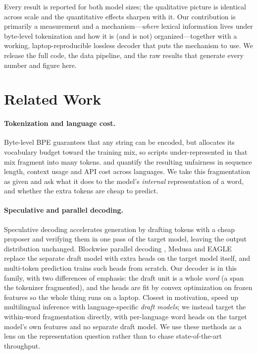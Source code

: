 \documentclass[11pt]{article}
\begin{document}
Every result is reported for both model sizes; the qualitative picture is
identical across scale and the quantitative effects sharpen with it. Our
contribution is primarily a measurement and a mechanism---\emph{where} lexical
information lives under byte-level tokenization and how it is (and is not)
organized---together with a working, laptop-reproducible lossless decoder that
puts the mechanism to use. We release the full code, the data pipeline, and
the raw results that generate every number and figure here.

\section{Related Work}

\paragraph{Tokenization and language cost.} Byte-level BPE
\citep{sennrich2016bpe,radford2019gpt2} guarantees that any string can be
encoded, but allocates its vocabulary budget toward the training mix, so
scripts under-represented in that mix fragment into many tokens.
\citet{petrov2023tokenizers} and \citet{ahia2023costs} quantify the resulting
unfairness in sequence length, context usage and API cost across languages.
We take this fragmentation as given and ask what it does to the model's
\emph{internal} representation of a word, and whether the extra tokens are
cheap to predict.

\paragraph{Speculative and parallel decoding.} Speculative decoding
\citep{leviathan2023speculative,chen2023speculative} accelerates generation by
drafting tokens with a cheap proposer and verifying them in one pass of the
target model, leaving the output distribution unchanged. Blockwise parallel
decoding \citep{stern2018blockwise}, Medusa \citep{cai2024medusa} and EAGLE
\citep{li2024eagle} replace the separate draft model with extra heads on the
target model itself, and multi-token prediction \citep{gloeckle2024multitoken}
trains such heads from scratch. Our decoder is in this family, with two
differences of emphasis: the draft unit is a whole \emph{word} (a span the
tokenizer fragmented), and the heads are fit by convex optimization on frozen
features so the whole thing runs on a laptop. Closest in motivation,
\citet{yi2024multilingual} speed up multilingual inference with
language-specific \emph{draft models}; we instead target the within-word
fragmentation directly, with per-language word heads on the target model's own
features and no separate draft model. We use these methods as a lens on the
representation question rather than to chase state-of-the-art throughput.
\end{document}
